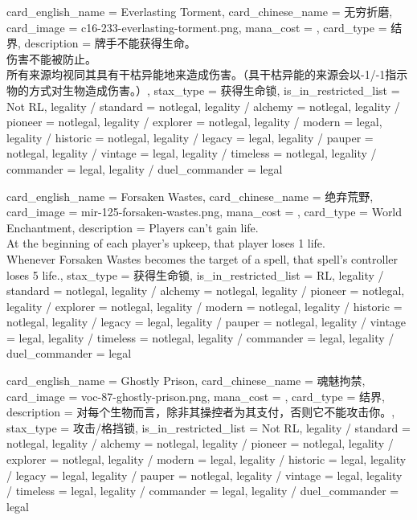 \documentclass[lang = cn, color = black, 10pt]{AllThatStax}
\begin{document}
\card
{
	card_english_name = {Everlasting Torment},
	card_chinese_name = {无穷折磨},
	card_image = c16-233-everlasting-torment.png,
	mana_cost = ,
	card_type = 结界,
	description = {牌手不能获得生命。\\
		伤害不能被防止。\\
		所有来源均视同其具有干枯异能地来造成伤害。（具干枯异能的来源会以-1/-1指示物的方式对生物造成伤害。）},
	stax_type = 获得生命锁,
	is_in_restricted_list = Not RL,
	legality / standard = notlegal,
	legality / alchemy = notlegal,
	legality / pioneer = notlegal,
	legality / explorer = notlegal,
	legality / modern = legal,
	legality / historic = notlegal,
	legality / legacy = legal,
	legality / pauper = notlegal,
	legality / vintage = legal,
	legality / timeless = notlegal,
	legality / commander = legal,
	legality / duel_commander = legal
}

\card
{
	card_english_name = {Forsaken Wastes},
	card_chinese_name = {绝弃荒野},
	card_image = mir-125-forsaken-wastes.png,
	mana_cost = ,
	card_type = World Enchantment,
	description = {Players can't gain life.\\
		At the beginning of each player's upkeep, that player loses 1 life.\\
		Whenever Forsaken Wastes becomes the target of a spell, that spell's controller loses 5 life.},
	stax_type = 获得生命锁,
	is_in_restricted_list = RL,
	legality / standard = notlegal,
	legality / alchemy = notlegal,
	legality / pioneer = notlegal,
	legality / explorer = notlegal,
	legality / modern = notlegal,
	legality / historic = notlegal,
	legality / legacy = legal,
	legality / pauper = notlegal,
	legality / vintage = legal,
	legality / timeless = notlegal,
	legality / commander = legal,
	legality / duel_commander = legal
}

\card
{
	card_english_name = {Ghostly Prison},
	card_chinese_name = {魂魅拘禁},
	card_image = voc-87-ghostly-prison.png,
	mana_cost = ,
	card_type = 结界,
	description = {对每个生物而言，除非其操控者为其支付，否则它不能攻击你。},
	stax_type = 攻击/格挡锁,
	is_in_restricted_list = Not RL,
	legality / standard = notlegal,
	legality / alchemy = notlegal,
	legality / pioneer = notlegal,
	legality / explorer = notlegal,
	legality / modern = legal,
	legality / historic = legal,
	legality / legacy = legal,
	legality / pauper = notlegal,
	legality / vintage = legal,
	legality / timeless = legal,
	legality / commander = legal,
	legality / duel_commander = legal
}
\end{document}
